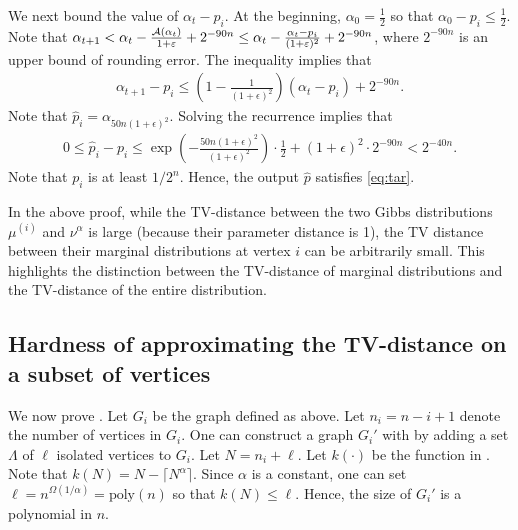 We next bound the value of $\alpha_t - p_i$. At the beginning, $\alpha_0 = \frac{1}{2}$ so that $\alpha_0 - p_i \leq \frac{1}{2}$. Note that $\alpha_{t+1} < \alpha_t -  \frac{\mathcal{A}(\alpha_{t})}{1+\varepsilon}+2^{-90n} \leq \alpha_t -  \frac{\alpha_t-p_i}{(1+\varepsilon)^2}+2^{-90n} $, where $2^{-90n}$ is an upper bound of rounding error. The inequality implies that 
\begin{align*}
    \alpha_{t+1} - p_i \leq \left( 1 - \frac{1}{(1+\epsilon)^2} \right)(\alpha_t - p_i) + 2^{-90n}.
\end{align*}
Note that $\hat{p}_i = \alpha_{50n(1+\epsilon)^2}$.
Solving the recurrence implies that
\begin{align*}
    0 \leq \hat{p}_i - p_i \leq \exp\left( -\frac{50n(1+\epsilon)^2}{(1+\epsilon)^2} \right)\cdot \frac{1}{2} + (1+\epsilon)^2 \cdot 2^{-90n} < 2^{-40n}.
\end{align*}
Note that $p_i$ is at least $1/2^n$. Hence, the output $\hat{p}$ satisfies \eqref{eq:tar}.

\begin{remark*}
In the above proof, while the TV-distance between the two Gibbs distributions \(\mu^{(i)}\) and \(\nu^{\alpha}\) is large (because their parameter distance is 1), the TV distance between their marginal distributions at vertex \(i\) can be arbitrarily small. This highlights the distinction between the TV-distance of marginal distributions and the TV-distance of the entire distribution.
\end{remark*}


\subsection{Hardness of approximating the TV-distance on a subset of vertices}
We now prove . Let $G_i$ be the graph defined as above. 
Let $n_i = n - i + 1$ denote the number of vertices in $G_i$.
One can construct a graph $G_i'$ with by adding a set $\Lambda$ of $\ell$ isolated vertices to $G_i$.  Let $N = n_i + \ell$. Let $k(\cdot)$ be the function in . Note that $k(N) = N - \lceil N^\alpha \rceil$. Since $\alpha$ is a constant, one can set $\ell = n^{\Omega(1/\alpha)} = \mathrm{poly}(n)$ so that $k(N) \leq \ell$.
Hence, the size of $G_i'$ is a polynomial in $n$.


